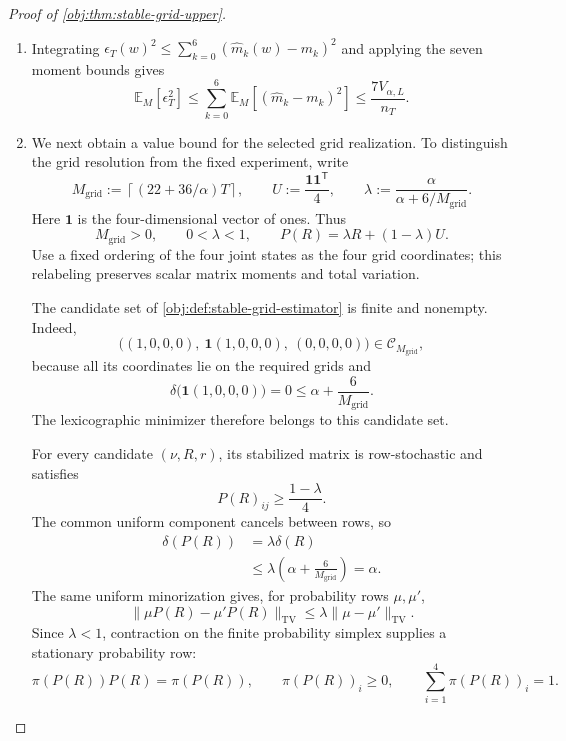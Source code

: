 \begin{proof}[Proof of \cref{obj:thm:stable-grid-upper}]
\begin{enumerate}
\item Integrating \(\epsilon_T(w)^2\le\sum_{k=0}^{6}(\widehat m_k(w)-m_k)^2\) and applying the seven moment bounds gives
\[
\mathbb E_M[\epsilon_T^2]
\le
\sum_{k=0}^{6}\mathbb E_M[(\widehat m_k-m_k)^2]
\le
\frac{7V_{\alpha,L}}{n_T}.
\]

\item We next obtain a value bound for the selected grid realization. To distinguish the grid resolution from the fixed experiment, write
\[
M_{\mathrm{grid}}
:=
\left\lceil(22+36/\alpha)T\right\rceil,
\qquad
U:=\frac{\mathbf1\mathbf1^{\mathsf T}}4,
\qquad
\lambda:=\frac{\alpha}{\alpha+6/M_{\mathrm{grid}}}.
\]
Here \(\mathbf1\) is the four-dimensional vector of ones. Thus
\[
M_{\mathrm{grid}}>0,
\qquad
0<\lambda<1,
\qquad
P(R)=\lambda R+(1-\lambda)U.
\]
Use a fixed ordering of the four joint states as the four grid coordinates; this relabeling preserves scalar matrix moments and total variation.

The candidate set of \cref{obj:def:stable-grid-estimator} is finite and nonempty. Indeed,
\[
\bigl((1,0,0,0),\ \mathbf1(1,0,0,0),\ (0,0,0,0)\bigr)
\in\mathcal C_{M_{\mathrm{grid}}},
\]
because all its coordinates lie on the required grids and
\[
\delta\bigl(\mathbf1(1,0,0,0)\bigr)=0
\le\alpha+\frac6{M_{\mathrm{grid}}}.
\]
The lexicographic minimizer therefore belongs to this candidate set.

For every candidate \((\nu,R,r)\), its stabilized matrix is row-stochastic and satisfies
\[
P(R)_{ij}\ge\frac{1-\lambda}{4}.
\]
The common uniform component cancels between rows, so
\[
\begin{aligned}
\delta(P(R))
&=
\lambda\delta(R)\\
&\le
\lambda\left(\alpha+\frac6{M_{\mathrm{grid}}}\right)
=
\alpha.
\end{aligned}
\]
The same uniform minorization gives, for probability rows \(\mu,\mu'\),
\[
\|\mu P(R)-\mu'P(R)\|_{\mathrm{TV}}
\le
\lambda\|\mu-\mu'\|_{\mathrm{TV}}.
\]
Since \(\lambda<1\), contraction on the finite probability simplex supplies a stationary probability row:
\[
\pi(P(R))P(R)=\pi(P(R)),
\qquad
\pi(P(R))_i\ge0,
\qquad
\sum_{i=1}^{4}\pi(P(R))_i=1.
\]


\end{enumerate}
\end{proof}
